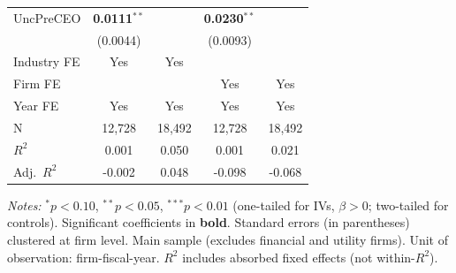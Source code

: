 \begin{landscape}
\begin{table}[H]
\begin{tabular}{lcccc}
UncPreCEO & \textbf{0.0111}$^{**}$ &  & \textbf{0.0230}$^{**}$ &  \\
 & (0.0044) &  & (0.0093) &  \\
\midrule
Industry FE & Yes & Yes &  &  \\
Firm FE &  &  & Yes & Yes \\
Year FE & Yes & Yes & Yes & Yes \\
\midrule
N & 12,728 & 18,492 & 12,728 & 18,492 \\
$R^2$ & 0.001 & 0.050 & 0.001 & 0.021 \\
Adj.~$R^2$ & -0.002 & 0.048 & -0.098 & -0.068 \\
\bottomrule
\end{tabular}
\begin{minipage}{\linewidth}
\vspace{2pt}\scriptsize
\textit{Notes:} $^{*}p<0.10$, $^{**}p<0.05$, $^{***}p<0.01$ (one-tailed for IVs, $\beta > 0$; two-tailed for controls).
 Significant coefficients in \textbf{bold}.
 Standard errors (in parentheses) clustered at firm level.
 Main sample (excludes financial and utility firms). Unit of observation: firm-fiscal-year.
 $R^2$ includes absorbed fixed effects (not within-$R^2$).
\end{minipage}
\end{table}
\end{landscape}